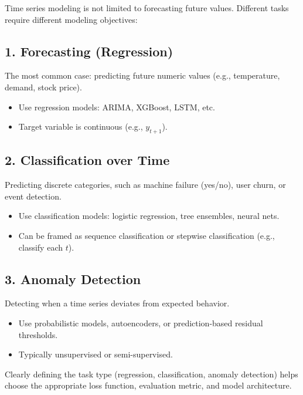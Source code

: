 \documentclass[12pt,openany, draft]{book}
\begin{document}
Time series modeling is not limited to forecasting future values. Different tasks require different modeling objectives:


\subsection*{1. Forecasting (Regression)}

The most common case: predicting future numeric values (e.g., temperature, demand, stock price).

\begin{itemize}
    \item Use regression models: ARIMA, XGBoost, LSTM, etc.
    \item Target variable is continuous (e.g., $y_{t+1}$).
\end{itemize}


\subsection*{2. Classification over Time}

Predicting discrete categories, such as machine failure (yes/no), user churn, or event detection.

\begin{itemize}
    \item Use classification models: logistic regression, tree ensembles, neural nets.
    \item Can be framed as sequence classification or stepwise classification (e.g., classify each $t$).
\end{itemize}


\subsection*{3. Anomaly Detection}

Detecting when a time series deviates from expected behavior.

\begin{itemize}
    \item Use probabilistic models, autoencoders, or prediction-based residual thresholds.
    \item Typically unsupervised or semi-supervised.
\end{itemize}

\begin{notebox}
Clearly defining the task type (regression, classification, anomaly detection) helps choose the appropriate loss function, evaluation metric, and model architecture.
\end{notebox}
\end{document}
